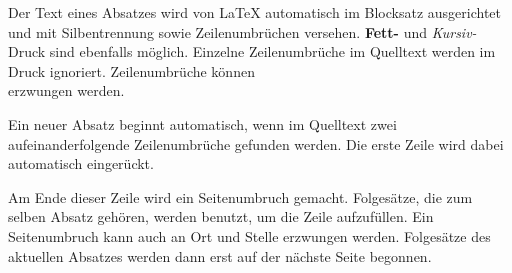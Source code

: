 \documentclass{article}
\begin{document}
Der Text eines Absatzes wird von LaTeX automatisch im
Blocksatz ausgerichtet und mit Silbentrennung sowie
Zeilenumbrüchen versehen. \textbf{Fett-} und
\textit{Kursiv-}Druck sind ebenfalls möglich.
Einzelne Zeilenumbrüche im Quelltext werden im Druck ignoriert.
Zeilenumbrüche können\\
erzwungen \newline
werden.

Ein neuer Absatz beginnt automatisch, wenn im Quelltext zwei
aufeinanderfolgende Zeilenumbrüche gefunden werden. Die erste
Zeile wird dabei automatisch eingerückt.

Am Ende dieser Zeile wird ein Seitenumbruch gemacht. \pagebreak
Folgesätze, die zum selben Absatz gehören, werden benutzt, um die Zeile aufzufüllen.
Ein Seitenumbruch kann auch an Ort und Stelle erzwungen werden. \newpage
Folgesätze des aktuellen Absatzes werden dann erst auf der nächste Seite begonnen.
\end{document}
